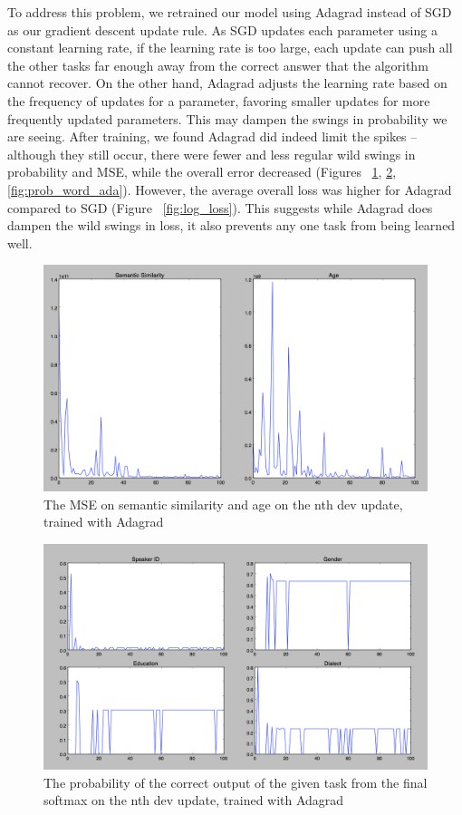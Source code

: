 \documentclass{article}
\begin{document}
To address this problem, we retrained our model using Adagrad instead of SGD as our gradient descent update rule.  As SGD updates each parameter using a constant learning rate, if the learning rate is too large, each update can push all the other tasks far enough away from the correct answer that the algorithm cannot recover.  On the other hand, Adagrad adjusts the learning rate based on the frequency of updates for a parameter, favoring smaller updates for more frequently updated parameters.  This may dampen the swings in probability we are seeing.  After training, we found Adagrad did indeed limit the spikes -- although they still occur, there were fewer and less regular wild swings in probability and MSE, while the overall error decreased (Figures ~\ref{fig:mse_semantic_ada}, \ref{fig:prob_ada}, \ref{fig:prob_word_ada}).  However, the average overall loss was higher for Adagrad compared to SGD (Figure ~\ref{fig:log_loss}).  This suggests while Adagrad does dampen the wild swings in loss, it also prevents any one task from being learned well.

\begin{figure}[h!]
\centering
\includegraphics[scale=.2]{images/adagrad_mle.png}
\caption{The MSE on semantic similarity and age on the nth dev update, trained with Adagrad}
\label{fig:mse_semantic_ada}
\end{figure}

\begin{figure}[h!]
\centering
\includegraphics[scale=.25]{images/adagrad_4task_prediction.png}
\caption{The probability of the correct output of the given task from the final softmax on the nth dev update, trained with Adagrad}
\label{fig:prob_ada}
\end{figure}
\end{document}

